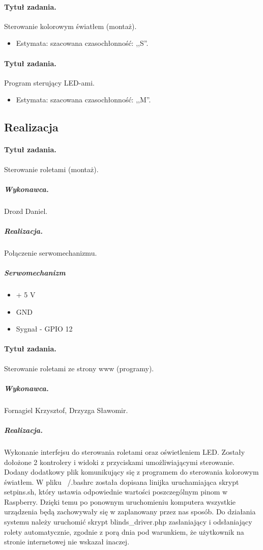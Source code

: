 \paragraph{Tytuł zadania.} Sterowanie kolorowym światłem (montaż).
\begin{itemize}
	\item Estymata: szacowana czasochłonność: ,,S''.
\end{itemize}

\paragraph{Tytuł zadania.} Program sterujący LED-ami.
\begin{itemize}
	\item Estymata: szacowana czasochłonność: ,,M''.
\end{itemize}


\subsection{Realizacja}

\paragraph{Tytuł zadania.} Sterowanie roletami (montaż).
\subparagraph{Wykonawca.} Drozd Daniel.
\subparagraph{Realizacja.} Połączenie serwomechanizmu.
\subparagraph{Serwomechanizm}

\begin{itemize}
	\item + 5 V
	\item GND
	\item Sygnał - GPIO 12
\end{itemize}
\paragraph{Tytuł zadania.} Sterowanie roletami ze strony www (programy).
\subparagraph{Wykonawca.} Fornagiel Krzysztof, Drzyzga Sławomir.
\subparagraph{Realizacja.} Wykonanie interfejsu do sterowania roletami oraz oświetleniem LED. Zostały dołożone 2 kontrolery i widoki z przyciskami umożliwiającymi sterowanie. Dodany dodatkowy plik komunikujący się z programem do sterowania kolorowym światłem. W pliku ~/.bashrc została dopisana linijka uruchamiająca skrypt setpins.sh, który ustawia odpowiednie wartości poszczególnym pinom w Raspberry. Dzięki temu po ponownym uruchomieniu komputera wszystkie urządzenia będą zachowywały się w zaplanowany przez nas sposób. Do działania systemu należy uruchomić skrypt blinds\_driver.php zasłaniający i odsłaniający rolety automatycznie, zgodnie z porą dnia pod warunkiem, że użytkownik na stronie internetowej nie wskazał inaczej.
